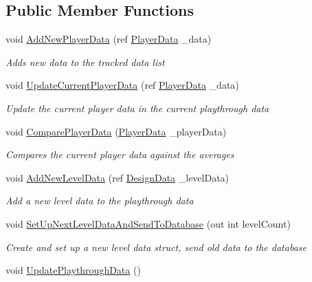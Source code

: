 \subsection*{Public Member Functions}
\begin{DoxyCompactItemize}
\item 
void \mbox{\hyperlink{class_data_tracker_a385ec3ae6529d79a33932e3c759ec2b5}{Add\+New\+Player\+Data}} (ref \mbox{\hyperlink{struct_player_data}{Player\+Data}} \+\_\+data)
\begin{DoxyCompactList}\small\item\em Adds new data to the tracked data list \end{DoxyCompactList}\item 
void \mbox{\hyperlink{class_data_tracker_ac3e1b7782c5a373f34f909549055fd6e}{Update\+Current\+Player\+Data}} (ref \mbox{\hyperlink{struct_player_data}{Player\+Data}} \+\_\+data)
\begin{DoxyCompactList}\small\item\em Update the current player data in the current playthrough data \end{DoxyCompactList}\item 
void \mbox{\hyperlink{class_data_tracker_a4869a1c8785620380fa42fef58d7ad6a}{Compare\+Player\+Data}} (\mbox{\hyperlink{struct_player_data}{Player\+Data}} \+\_\+player\+Data)
\begin{DoxyCompactList}\small\item\em Compares the current player data against the averages \end{DoxyCompactList}\item 
void \mbox{\hyperlink{class_data_tracker_ad8d42a698f0dc7bfa12d5200e158d0a4}{Add\+New\+Level\+Data}} (ref \mbox{\hyperlink{class_design_data}{Design\+Data}} \+\_\+level\+Data)
\begin{DoxyCompactList}\small\item\em Add a new level data to the playthrough data \end{DoxyCompactList}\item 
void \mbox{\hyperlink{class_data_tracker_af9257217e007188c0437f1d446542942}{Set\+Up\+Next\+Level\+Data\+And\+Send\+To\+Database}} (out int level\+Count)
\begin{DoxyCompactList}\small\item\em Create and set up a new level data struct, send old data to the database \end{DoxyCompactList}\item 
void \mbox{\hyperlink{class_data_tracker_a4b123c238cc2f165d9d12ef9c9d408d2}{Update\+Playthrough\+Data}} ()

\end{DoxyCompactItemize}
